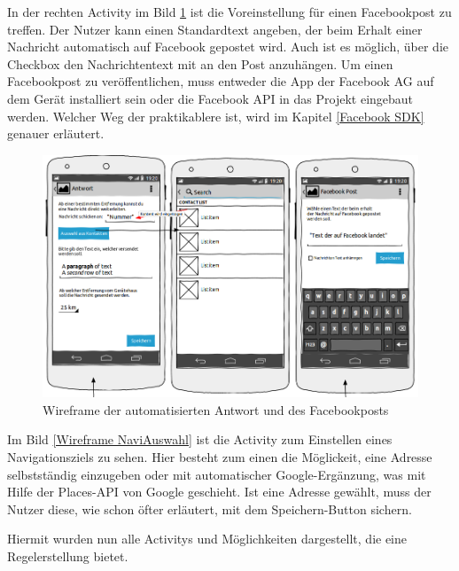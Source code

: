 In der rechten Activity im Bild \ref{Wireframe Antwort} ist die Voreinstellung f\"ur einen Facebookpost zu treffen. Der Nutzer kann einen Standardtext angeben, der beim Erhalt einer Nachricht automatisch auf Facebook gepostet wird. Auch ist es m\"oglich, \"uber die Checkbox den Nachrichtentext mit an den Post anzuh\"angen. Um einen Facebookpost zu ver\"offentlichen, muss entweder die App der Facebook AG auf dem Ger\"at installiert sein oder die Facebook API in das Projekt eingebaut werden. Welcher Weg der praktikablere ist, wird im Kapitel \ref{Facebook SDK} genauer erl\"autert.
\begin{figure}[!ht]
\centering
\includegraphics[width=16cm]{Bilder/WireframeAntwort.png}
\caption{Wireframe der automatisierten Antwort und des Facebookposts}
\label{Wireframe Antwort}
\centering
\end{figure}

Im Bild \ref{Wireframe NaviAuswahl} ist die Activity zum Einstellen eines Navigationsziels zu sehen. Hier besteht zum einen die M\"oglickeit, eine Adresse selbstst\"andig einzugeben oder mit automatischer Google-Erg\"anzung, was mit Hilfe der Places-\ac{API} von Google geschieht. Ist eine Adresse gew\"ahlt, muss der Nutzer diese, wie schon \"ofter erl\"autert, mit dem Speichern-Button sichern.

Hiermit wurden nun alle Activitys und M\"oglichkeiten dargestellt, die eine Regelerstellung bietet.

